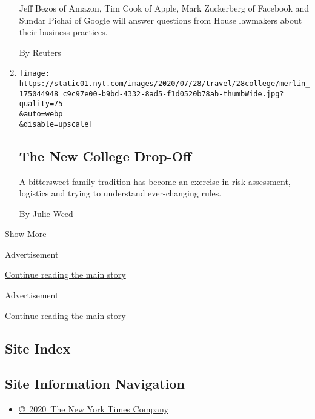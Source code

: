 \begin{enumerate}
  Jeff Bezos of Amazon, Tim Cook of Apple, Mark Zuckerberg of Facebook
  and Sundar Pichai of Google will answer questions from House lawmakers
  about their business practices.

  By Reuters
\item
  \href{/2020/07/29/travel/virus-college-travel-restrictions.html}{}

  \texttt{[image: https://static01.nyt.com/images/2020/07/28/travel/28college/merlin\_175044948\_c9c97e00-b9bd-4332-8ad5-f1d0520b78ab-thumbWide.jpg?quality=75\\\&auto=webp\\\&disable=upscale]}

  \hypertarget{the-new-college-drop-off}{%
  \subsection{The New College Drop-Off}\label{the-new-college-drop-off}}

  A bittersweet family tradition has become an exercise in risk
  assessment, logistics and trying to understand ever-changing rules.

  By Julie Weed
\end{enumerate}

Show More

Advertisement

\protect\hyperlink{after-mid2}{Continue reading the main story}

Advertisement

\protect\hyperlink{after-mktg}{Continue reading the main story}

\hypertarget{site-index}{%
\subsection{Site Index}\label{site-index}}

\hypertarget{site-information-navigation}{%
\subsection{Site Information
Navigation}\label{site-information-navigation}}

\begin{itemize}
\tightlist
\item
  \href{https://help.nytimes.com/hc/en-us/articles/115014792127-Copyright-notice}{©~2020~The
  New York Times Company}
\end{itemize}

